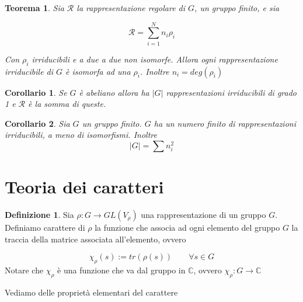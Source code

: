 \documentclass[11pt]{article}
\theoremstyle{plain}
\newtheorem{thm}{Teorema}[section]
\newtheorem*{cor}{Corollario}
\theoremstyle{definition}
\newtheorem{defn}{Definizione}[section]
\theoremstyle{remark}
\newcommand{\C}{\mathbb{C}}
\newcommand{\dsum}{\displaystyle\sum}
\begin{document}
\begin{thm}
Sia $\mathcal{R}$ la rappresentazione regolare di $G$, un gruppo finito, e sia 

\[ \mathcal{R} = \dsum_{i=1}^Nn_i \rho_i\]

Con $\rho_i$ irriducibili e a due a due non isomorfe. Allora ogni rappresentazione irriducibile di $G$ è isomorfa ad una $\rho_i$. Inoltre $n_i = deg(\rho_i)$ 
\label{thm: teorema importantissimo}
\end{thm}



\begin{cor}
Se $G$ è abeliano allora ha $|G|$ rappresentazioni irriducibili di grado 1 e $\mathcal{R}$ è la somma di queste.
\end{cor}



\begin{cor}
Sia $G$ un gruppo finito. $G$ ha un numero finito di rappresentazioni irriducibili, a meno di isomorfismi. Inoltre
\[|G| = \dsum n_i^2\]
\end{cor}



















\newpage
\section{Teoria dei caratteri}


\begin{defn}
Sia $\rho: G \to GL(V_\rho)$ una rappresentazione di un gruppo $G$. Definiamo carattere di $\rho$ la funzione che associa ad ogni elemento del gruppo $G$ la traccia della matrice associata all'elemento, ovvero

\[\chi_\rho(s) := tr (\rho(s)) \qquad \forall s \in G \]
Notare che $\chi_{\rho}$ è una funzione che va dal gruppo in $\C$, ovvero $\chi_{\rho}: G \to \C$

\end{defn}

Vediamo delle proprietà elementari del carattere
\end{document}
